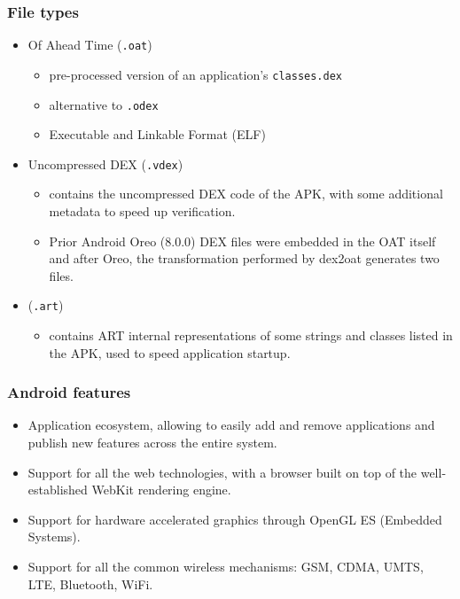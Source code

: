 \documentclass[10pt,xcolor=pdflatex]{beamer}
\begin{document}
\begin{frame}[fragile]\frametitle{File types}
	\begin{itemize}
	  \item Of Ahead Time (\texttt{.oat})
	    \begin{itemize}
	      \item pre-processed version of an application's \texttt{classes.dex}
	      \item alternative to \texttt{.odex}
	      \item Executable and Linkable Format (ELF)
	    \end{itemize}
      \item Uncompressed DEX (\texttt{.vdex})
        \begin{itemize}
          \item contains the uncompressed DEX code of the APK, with some additional metadata to speed up verification.
          \item Prior Android Oreo (8.0.0) DEX files were embedded in the OAT itself and after Oreo, the transformation performed by dex2oat generates two files.
        \end{itemize}
      \item (\texttt{.art})
        \begin{itemize}
          \item contains ART internal representations of some strings and classes listed in the APK, used to speed application startup.
        \end{itemize}
	\end{itemize}
\end{frame}


\begin{frame}\frametitle{Android features}
	\def\mezera{1em}
	\begin{itemize}
		\item Application ecosystem, allowing to easily add and remove applications and publish new features across the entire system.
		\item Support for all the web technologies, with a browser built on top of the well-established WebKit rendering engine.
		\item Support for hardware accelerated graphics through OpenGL ES (Embedded Systems).
		\item Support for all the common wireless mechanisms: GSM, CDMA, UMTS, LTE, Bluetooth, WiFi.
	\end{itemize}
\end{frame}
\end{document}
